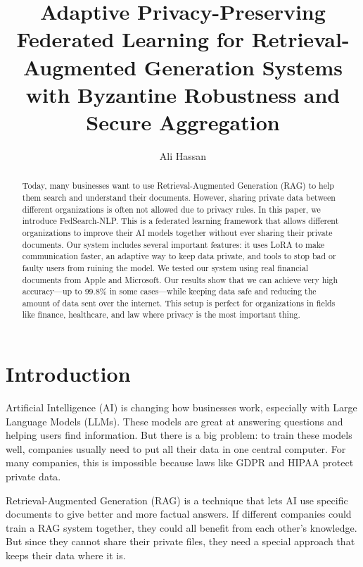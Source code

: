 \documentclass[acmsmall,screen]{acmart}
\begin{document}
\title{Adaptive Privacy-Preserving Federated Learning for Retrieval-Augmented Generation Systems with Byzantine Robustness and Secure Aggregation}

\author{Ali Hassan}

\begin{abstract}
Today, many businesses want to use Retrieval-Augmented Generation (RAG) to help them search and understand their documents. However, sharing private data between different organizations is often not allowed due to privacy rules. In this paper, we introduce FedSearch-NLP. This is a federated learning framework that allows different organizations to improve their AI models together without ever sharing their private documents. Our system includes several important features: it uses LoRA to make communication faster, an adaptive way to keep data private, and tools to stop bad or faulty users from ruining the model. We tested our system using real financial documents from Apple and Microsoft. Our results show that we can achieve very high accuracy—up to 99.8\% in some cases—while keeping data safe and reducing the amount of data sent over the internet. This setup is perfect for organizations in fields like finance, healthcare, and law where privacy is the most important thing.
\end{abstract}


\maketitle

\section{Introduction}

Artificial Intelligence (AI) is changing how businesses work, especially with Large Language Models (LLMs). These models are great at answering questions and helping users find information. But there is a big problem: to train these models well, companies usually need to put all their data in one central computer. For many companies, this is impossible because laws like GDPR and HIPAA protect private data.

Retrieval-Augmented Generation (RAG) is a technique that lets AI use specific documents to give better and more factual answers. If different companies could train a RAG system together, they could all benefit from each other's knowledge. But since they cannot share their private files, they need a special approach that keeps their data where it is.
\end{document}
